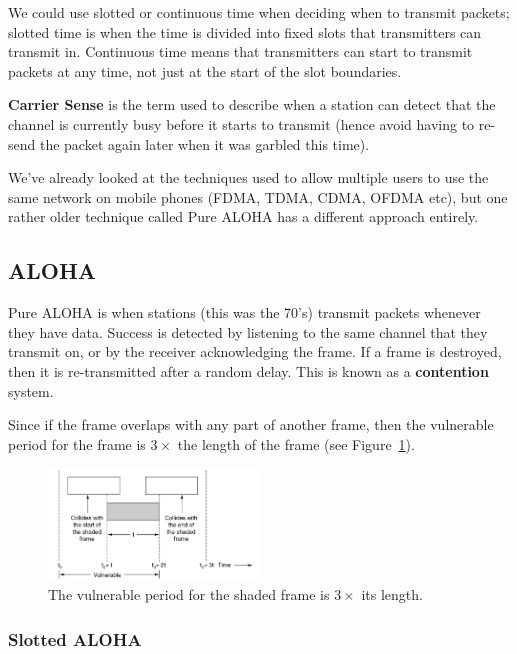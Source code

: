 We could use slotted or continuous time when deciding when to transmit packets;
slotted time is when the time is divided into fixed slots that transmitters can
transmit in. Continuous time means that transmitters can start to transmit
packets at any time, not just at the start of the slot boundaries.

\textbf{Carrier Sense} is the term used to describe when a station can detect
that the channel is currently busy before it starts to transmit (hence avoid
having to re-send the packet again later when it was garbled this time).

We've already looked at the techniques used to allow multiple users to use the
same network on mobile phones (FDMA, TDMA, CDMA, OFDMA etc), but one rather
older technique called Pure ALOHA has a different approach entirely.

\subsection{ALOHA}

Pure ALOHA is when stations (this was the 70's) transmit packets whenever they
have data. Success is detected by listening to the same channel that they
transmit on, or by the receiver acknowledging the frame. If a frame is
destroyed, then it is re-transmitted after a random delay. 
This is known as a \textbf{contention} system.

Since if the frame overlaps with any part of another frame, then the vulnerable
period for the frame is $3\times$ the length of the frame (see
Figure~\ref{aloha-vun}).

\begin{figure}[ht]
  \centering
  \includegraphics[width=0.5\textwidth]{images/aloha-vun}
  \caption{The vulnerable period for the shaded frame is $3\times$ its length.}
  \label{aloha-vun}
\end{figure}

\subsubsection{Slotted ALOHA}

